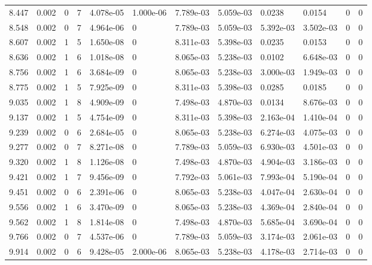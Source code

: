 \documentclass[preview]{standalone}
\begin{document}
{{{{\begin{tabular}{L{1.2cm}C{1.2cm} C{0.3cm}C{0.5cm} C{1.4cm}C{1.4cm} C{1.4cm}C{1.4cm} C{1.6cm}C{1.6cm} C{1.6cm}C{1.6cm}}
  8.447  &  0.002  & 0     &  7 &  4.078e-05  & 1.000e-06  &  7.789e-03&   5.059e-03& 0.0238 & 0.0154   &  0 & 0  \\ 
  8.548  &  0.002  & 0     &  7 &  4.964e-06  & 0  &  7.789e-03&   5.059e-03& 5.392e-03 & 3.502e-03   &  0 & 0  \\ 
  8.607  &  0.002  & 1     &  5 &  1.650e-08  & 0  &  8.311e-03&   5.398e-03& 0.0235 & 0.0153   &  0 & 0  \\ 
  8.636  &  0.002  & 1     &  6 &  1.018e-08  & 0  &  8.065e-03&   5.238e-03& 0.0102 & 6.648e-03   &  0 & 0  \\ 
  8.756  &  0.002  & 1     &  6 &  3.684e-09  & 0  &  8.065e-03&   5.238e-03& 3.000e-03 & 1.949e-03   &  0 & 0  \\ 
  8.775  &  0.002  & 1     &  5 &  7.925e-09  & 0  &  8.311e-03&   5.398e-03& 0.0285 & 0.0185   &  0 & 0  \\ 
  9.035  &  0.002  & 1     &  8 &  4.909e-09  & 0  &  7.498e-03&   4.870e-03& 0.0134 & 8.676e-03   &  0 & 0  \\ 
  9.137  &  0.002  & 1     &  5 &  4.754e-09  & 0  &  8.311e-03&   5.398e-03& 2.163e-04 & 1.410e-04   &  0 & 0  \\ 
  9.239  &  0.002  & 0     &  6 &  2.684e-05  & 0  &  8.065e-03&   5.238e-03& 6.274e-03 & 4.075e-03   &  0 & 0  \\ 
  9.277  &  0.002  & 0     &  7 &  8.271e-08  & 0  &  7.789e-03&   5.059e-03& 6.930e-03 & 4.501e-03   &  0 & 0  \\ 
  9.320  &  0.002  & 1     &  8 &  1.126e-08  & 0  &  7.498e-03&   4.870e-03& 4.904e-03 & 3.186e-03   &  0 & 0  \\ 
  9.421  &  0.002  & 1     &  7 &  9.456e-09  & 0  &  7.792e-03&   5.061e-03& 7.993e-04 & 5.190e-04   &  0 & 0  \\ 
  9.451  &  0.002  & 0     &  6 &  2.391e-06  & 0  &  8.065e-03&   5.238e-03& 4.047e-04 & 2.630e-04   &  0 & 0  \\ 
  9.556  &  0.002  & 1     &  6 &  3.470e-09  & 0  &  8.065e-03&   5.238e-03& 4.369e-04 & 2.840e-04   &  0 & 0  \\ 
  9.562  &  0.002  & 1     &  8 &  1.814e-08  & 0  &  7.498e-03&   4.870e-03& 5.685e-04 & 3.690e-04   &  0 & 0  \\ 
  9.766  &  0.002  & 0     &  7 &  4.537e-06  & 0  &  7.789e-03&   5.059e-03& 3.174e-03 & 2.061e-03   &  0 & 0  \\ 
  9.914  &  0.002  & 0     &  6 &  9.428e-05  & 2.000e-06  &  8.065e-03&   5.238e-03& 4.178e-03 & 2.714e-03   &  0 & 0  \\ 

\end{tabular}}}}}
\end{document}
